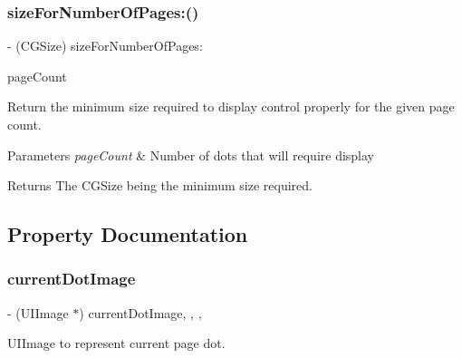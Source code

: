 \subsubsection{\texorpdfstring{size\+For\+Number\+Of\+Pages\+:()}{sizeForNumberOfPages:()}\hspace{0.1cm}{\footnotesize\ttfamily [3/3]}}
{\footnotesize\ttfamily -\/ (C\+G\+Size) size\+For\+Number\+Of\+Pages\+: \begin{DoxyParamCaption}\item[{(N\+S\+Integer)}]{page\+Count }\end{DoxyParamCaption}}

Return the minimum size required to display control properly for the given page count.


\begin{DoxyParams}{Parameters}
{\em page\+Count} & Number of dots that will require display\\
\hline
\end{DoxyParams}
\begin{DoxyReturn}{Returns}
The C\+G\+Size being the minimum size required. 
\end{DoxyReturn}


\subsection{Property Documentation}
\mbox{\label{interface_t_a_page_control_a716a53fa22d06cc42dcfe560f71da107}} 
\subsubsection{\texorpdfstring{current\+Dot\+Image}{currentDotImage}}
{\footnotesize\ttfamily -\/ (U\+I\+Image $\ast$) current\+Dot\+Image\hspace{0.3cm}{\ttfamily [read]}, {\ttfamily [write]}, {\ttfamily [nonatomic]}, {\ttfamily [assign]}}

U\+I\+Image to represent current page dot. \mbox{\label{interface_t_a_page_control_a68d81086bd050060b4285c3d63f7b074}} 
